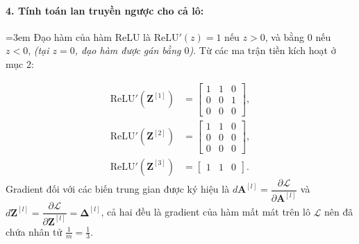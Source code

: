 \paragraph{4. Tính toán lan truyền ngược cho cả lô:}
{\emergencystretch=3em
Đạo hàm của hàm ReLU là $\text{ReLU}'(z) = 1$ nếu $z > 0$, và bằng $0$ nếu $z < 0$, \textit{(tại $z = 0$, đạo hàm được gán bằng $0$)}. Từ các ma trận tiền kích hoạt ở mục 2:\par}
\begin{align*}
\text{ReLU}'\!\left(\mathbf{Z}^{[1]}\right) &= \begin{bmatrix} 1 & 1 & 0 \\ 0 & 0 & 1 \\ 0 & 0 & 0 \end{bmatrix}, \\
\text{ReLU}'\!\left(\mathbf{Z}^{[2]}\right) &= \begin{bmatrix} 1 & 1 & 0 \\ 0 & 0 & 0 \\ 0 & 0 & 0 \end{bmatrix}, \\
\text{ReLU}'\!\left(\mathbf{Z}^{[3]}\right) &= \begin{bmatrix} 1 & 1 & 0 \end{bmatrix}.
\end{align*}
Gradient đối với các biến trung gian được ký hiệu là $d\mathbf{A}^{[l]} = \dfrac{\partial \mathcal{L}}{\partial \mathbf{A}^{[l]}}$ và $d\mathbf{Z}^{[l]} = \dfrac{\partial \mathcal{L}}{\partial \mathbf{Z}^{[l]}} = \boldsymbol{\Delta}^{[l]}$, cả hai đều là gradient của hàm mất mát trên lô $\mathcal{L}$ nên đã chứa nhân tử $\frac{1}{m} = \frac{1}{3}$.
